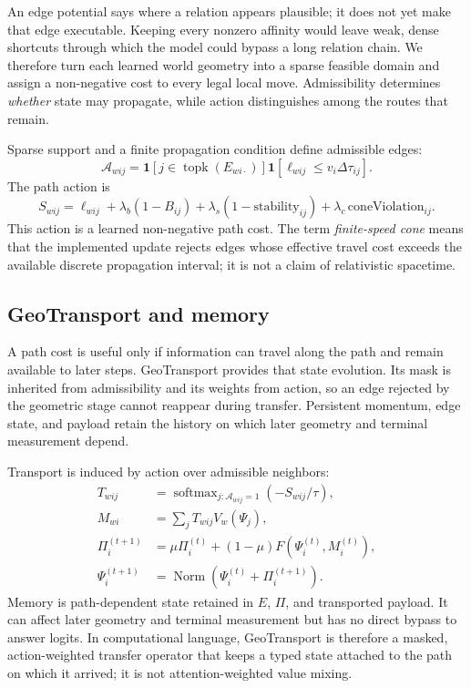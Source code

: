 \documentclass[11pt]{article}
\begin{document}
An edge potential says where a relation appears plausible; it does not yet make
that edge executable. Keeping every nonzero affinity would leave weak, dense
shortcuts through which the model could bypass a long relation chain. We
therefore turn each learned world geometry into a sparse feasible domain and
assign a non-negative cost to every legal local move. Admissibility determines
\emph{whether} state may propagate, while action distinguishes among the routes
that remain.

Sparse support and a finite propagation condition define admissible edges:
\begin{equation}
\mathcal{A}_{wij}=
\mathbf{1}[j\in\operatorname{topk}(E_{wi\cdot})]
\mathbf{1}[\ell_{wij}\le v_i\Delta\tau_{ij}].
\end{equation}
The path action is
\begin{equation}
S_{wij}=\ell_{wij}+\lambda_b(1-B_{ij})+
\lambda_s(1-\mathrm{stability}_{ij})+
\lambda_c\,\mathrm{coneViolation}_{ij}.
\label{eq:action}
\end{equation}
This action is a learned non-negative path cost. The term \emph{finite-speed
cone} means that the implemented update rejects edges whose effective travel
cost exceeds the available discrete propagation interval; it is not a claim
of relativistic spacetime.

\subsection{GeoTransport and memory}

A path cost is useful only if information can travel along the path and remain
available to later steps. GeoTransport provides that state evolution. Its mask
is inherited from admissibility and its weights from action, so an edge rejected
by the geometric stage cannot reappear during transfer. Persistent momentum,
edge state, and payload retain the history on which later geometry and terminal
measurement depend.

Transport is induced by action over admissible neighbors:
\begin{align}
T_{wij} &= \operatorname{softmax}_{j:\mathcal{A}_{wij}=1}
                  (-S_{wij}/\tau), \\
M_{wi} &= \sum_j T_{wij}V_w(\Psi_j), \\
\Pi_i^{(t+1)} &= \mu\Pi_i^{(t)}+(1-\mu)
                  F(\Psi_i^{(t)},M_i^{(t)}), \\
\Psi_i^{(t+1)} &= \operatorname{Norm}
                  (\Psi_i^{(t)}+\Pi_i^{(t+1)}).
\end{align}
Memory is path-dependent state retained in $E$, $\Pi$, and transported payload.
It can affect later geometry and terminal measurement but has no direct bypass
to answer logits. In computational language, GeoTransport is therefore a
masked, action-weighted transfer operator that keeps a typed state attached to
the path on which it arrived; it is not attention-weighted value mixing.
\end{document}
